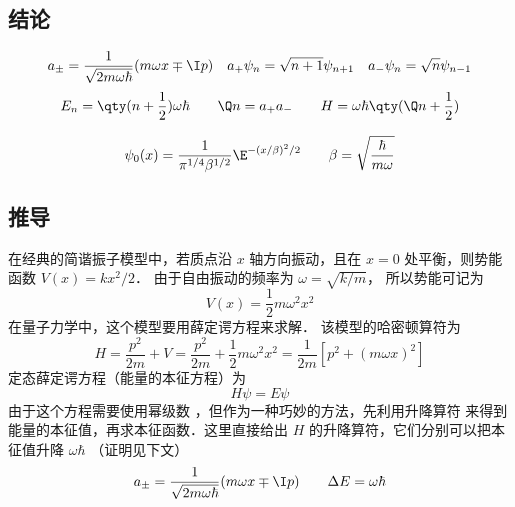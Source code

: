 


\subsection{结论}
\begin{equation}
a_\pm = \frac{1}{\sqrt{2m\omega\hbar}} (m\omega x \mp \I p) \quad
a_+ \psi_n = \sqrt{n + 1} \psi_{n+1}
\quad
a_- \psi_n = \sqrt n \psi_{n-1}
\end{equation}
\begin{equation}
E_n = \qty(n+\frac12)\omega \hbar \qquad
\Q n = a_+ a_ - \qquad
H = \omega\hbar \qty(\Q n + \frac12)
\end{equation}

\begin{equation}
\psi_0 (x) = \frac{1}{\pi^{1/4} \beta^{1/2}} \E^{-(x/\beta)^2/2}  \qquad \beta  = \sqrt{\frac{\hbar}{m\omega}}
\end{equation}

\subsection{推导}
在经典的简谐振子模型中，若质点沿 $x$ 轴方向振动，且在 $x = 0$ 处平衡，则势能函数 $V(x) = k x^2/2$． 由于自由振动的频率为 $\omega = \sqrt{k/m}$， 所以势能可记为
\begin{equation}
V(x) = \frac12 m \omega^2 x^2
\end{equation}
在量子力学中，这个模型要用薛定谔方程来求解． 该模型的哈密顿算符为
\begin{equation}
H = \frac{p^2}{2m} + V = \frac{p^2}{2m} + \frac12 m\omega^2 x^2 = \frac{1}{2m} [p^2 + (m\omega x)^2]
\end{equation}
定态薛定谔方程（能量的本征方程）为
\begin{equation}\label{QSHOop_eq6}
H\psi  = E\psi
\end{equation}
由于这个方程需要使用幂级数%
，但作为一种巧妙的方法，先利用升降算符 来得到能量的本征值，再求本征函数．这里直接给出 $H$ 的升降算符，它们分别可以把本征值升降 $\omega\hbar$ （证明见下文）
\begin{equation}
a_\pm = \frac{1}{\sqrt{2m\omega\hbar}} (m\omega x \mp \I p)
\qquad
\Delta E = \omega \hbar
\end{equation}

